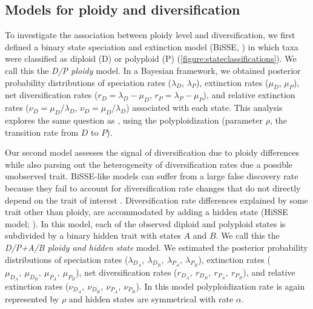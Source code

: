 

\subsection{Models for ploidy and diversification}

To investigate the association between ploidy level and diversification, we first defined a binary state speciation and extinction model (BiSSE, \citealt{maddison_2007}) in which taxa were classified as diploid (D) or polyploid (P) (\cref{figure:stateclassifications}).
We call this the \textit{D/P ploidy} model. %
In a Bayesian framework, we obtained posterior probability distributions of speciation rates ($\lambda_D$, $\lambda_P$), extinction rates ($\mu_D$, $\mu_P$), net diversification rates ($r_D=\lambda_D-\mu_D$, $r_P=\lambda_P-\mu_P$), and relative extinction rates ($\nu_D=\mu_D / \lambda_D$, $\nu_D=\mu_D / \lambda_D$) associated with each state.
This analysis explores the same question as \citet{mayrose_2011, mayrose_2015}, using the polyploidization (parameter $\rho$, the transition rate from $D$ to $P$). %


Our second model assesses the signal of diversification due to ploidy differences while also parsing out the heterogeneity of diversification rates due a possible unobserved trait.
BiSSE-like models can suffer from a large false discovery rate because they fail to account for diversification rate changes that do not directly depend on the trait of interest \citep{rabosky_2015, beaulieu_2016}.
Diversification rate differences explained by some trait other than ploidy, are accommodated by adding a hidden state (HiSSE model; \citealt{beaulieu_2016}). %
In this model, each of the observed diploid and polyploid states is subdivided by a binary hidden trait with states $A$ and $B$.
We call this the \textit{D/P+A/B ploidy and hidden state} model. 
We estimated the posterior probability distributions of speciation rates ($\lambda_{D_A},\ \lambda_{D_B},\ \lambda_{P_A},\ \lambda_{P_B}$), extinction rates ($\mu_{D_A},\ \mu_{D_B},\ \mu_{P_A},\ \mu_{P_B}$), net diversification rates ($r_{D_A},\ r_{D_B},\ r_{P_A},\ r_{P_B}$), and relative extinction rates ($\nu_{D_A},\ \nu_{D_B},\ \nu_{P_A},\ \nu_{P_B}$).
In this model polyploidization rate  is again represented by $\rho$  and hidden states are symmetrical with rate $\alpha$. %

